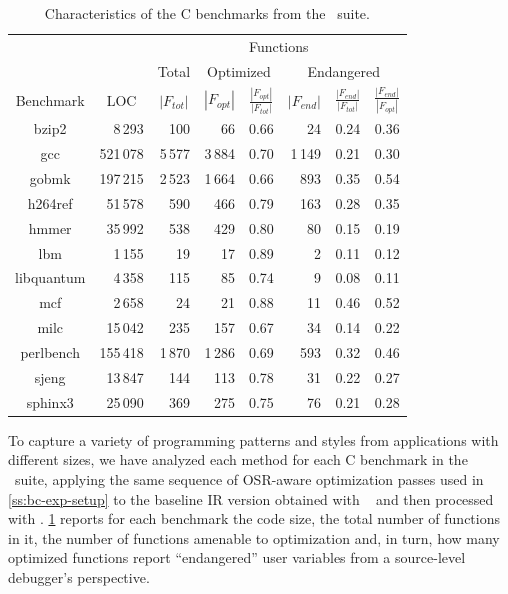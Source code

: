 \begin{table}[!t]
\begin{center}
\begin{small}
\begin{tabular}{ |c|r|r|r|r|r|r|r| }
\cline{3-8}
\multicolumn{2}{l|}{} & \multicolumn{6}{c|}{Functions} \\
\cline{3-8}
\multicolumn{2}{l|}{} & \multicolumn{1}{c|}{Total} & \multicolumn{2}{c|}{Optimized} & \multicolumn{3}{c|}{Endangered} \\
\hline
Benchmark & \multicolumn{1}{c|}{LOC} & \multicolumn{1}{c|}{$|F_{tot}|$} & \multicolumn{1}{c|}{$|F_{opt}|$}  & \multicolumn{1}{c|}{\tiny$\frac{|F_{opt}|}{|F_{tot}|}$} & \multicolumn{1}{c|}{$|F_{end}|$} & \multicolumn{1}{c|}{\tiny$\frac{|F_{end}|}{|F_{tot}|}$} & \multicolumn{1}{c|}{\tiny$\frac{|F_{end}|}{|F_{opt}|}$} \\ 
\hline
\hline
bzip2 & 8\,293 & 100 & 66 & 0.66 & 24 & 0.24 & 0.36 \\ 
\hline
gcc & 521\,078 & 5\,577 & 3\,884 & 0.70 & 1\,149 & 0.21 & 0.30 \\
\hline
gobmk & 197\,215 & 2\,523 & 1\,664 & 0.66 & 893 & 0.35 & 0.54 \\ 
\hline
h264ref & 51\,578 & 590 & 466 & 0.79 & 163 & 0.28 & 0.35 \\ 
\hline
hmmer & 35\,992 & 538 & 429 & 0.80 & 80 & 0.15 & 0.19 \\ 
\hline
lbm & 1\,155 & 19 & 17 & 0.89 & 2 & 0.11 & 0.12 \\ 
\hline
libquantum & 4\,358 & 115 & 85 & 0.74 & 9 & 0.08 & 0.11\\ 
\hline
mcf & 2\,658 & 24 & 21 & 0.88 & 11 & 0.46 & 0.52 \\ 
\hline
milc & 15\,042 & 235 & 157 & 0.67 & 34 & 0.14 & 0.22\\ 
\hline
perlbench & 155\,418 & 1\,870 & 1\,286 & 0.69 & 593 & 0.32 & 0.46 \\ 
\hline
sjeng & 13\,847 & 144 & 113 & 0.78 & 31 & 0.22 & 0.27 \\ 
\hline
sphinx3 & 25\,090 & 369 & 275 & 0.75 & 76 & 0.21 & 0.28 \\ 
\hline
\end{tabular} 
\end{small}
\end{center}
\caption{\label{tab:CS-debug-benchmarks} Characteristics of the C benchmarks from the \speccpu\ suite.} 
\end{table}

To capture a variety of programming patterns and styles from applications with different sizes, we have analyzed each method for each C benchmark in the \speccpu\ suite, applying the same sequence of OSR-aware optimization passes used in \mysection\ref{ss:bc-exp-setup} to the baseline IR version obtained with \clang\  and then processed with \memtoreg. \mytable\ref{tab:CS-debug-benchmarks} reports for each benchmark the code size, the total number of functions in it, the number of functions amenable to optimization and, in turn, how many optimized functions report ``endangered'' user variables from a source-level debugger's perspective.


